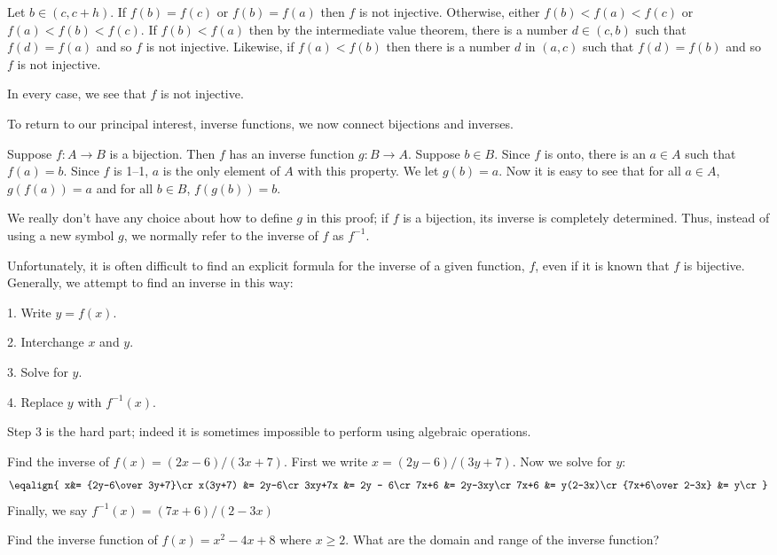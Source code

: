 Let $b\in (c,c+h)$. If $f(b) = f(c)$ or $f(b) =f(a) $ then $f$
is not injective. Otherwise, either $f(b) < f(a)<f(c) $ or $f(a)
<f(b)<f(c) $. If $f(b) < f(a) $ then by the intermediate value
theorem, there is a number $d\in (c, b) $ such that $f(d) =f(a)$ and
so $f$ is not injective.
 Likewise, if $f(a) < f(b) $ then there is a number $d$ in $(a,c) $
 such that $f(d) = f(b)$ and so $f$ is not injective. 

In every case, we see that $f$ is not injective.
\endproof

To return to our principal interest, inverse functions, we now connect
bijections and inverses.

\thm Suppose $f\colon A\to B$ is a bijection. Then $f$ has an inverse
function $g\colon B\to A$. 
\endthm
\proof
Suppose $b\in B$. Since $f$ is onto, there is an $a\in A$ such that 
$f(a)=b$. Since $f$ is 1--1, $a$ is the only element of $A$ with this
property. We let $g(b)=a$. Now it is easy to see that
for all $a\in A$, $g(f(a))=a$ and for all $b\in B$, $f(g(b))=b$. 
\endproof

We really don't have any choice about how to define $g$ in this proof;
if $f$ is a bijection, its inverse is completely determined. Thus,
instead of using a new symbol $g$, we normally refer to the inverse of
$f$ as $f^{-1}$.

Unfortunately, it is often difficult to find an explicit formula
for the inverse of a given function, $f$, even if it is known that $f$
is bijective. Generally, we attempt to find an inverse in this way:

\beginlist
\item{1.} Write $y=f(x)$.
\item{2.} Interchange $x$ and $y$.
\item{3.} Solve for $y$.
\item{4.} Replace $y$ with $f^{-1}(x)$.
\endlist

Step 3 is the hard part; indeed it is
sometimes   impossible to perform using algebraic operations.

\example Find the inverse of $f(x) =(2x-6)/(3x+7)$.
First we write $x=(2y-6)/(3y+7)$.
Now we solve for $y$:
$$\eqalign{
x&= {2y-6\over3y+7}\cr
x(3y+7) &= 2y-6\cr
3xy+7x &= 2y - 6\cr
7x+6 &= 2y-3xy\cr
7x+6 &= y(2-3x)\cr
{7x+6\over 2-3x} &= y\cr
}$$
Finally, we say $f^{-1} (x) =(7x+6)/(2-3x)$
\endexample


\example Find the inverse function of $f(x) =x^2 - 4x + 8 $
where $x \geq 2 $. What are the domain and range of the inverse
function?

